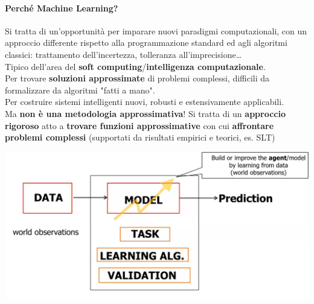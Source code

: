 \documentclass[10pt]{book}
\begin{document}
\paragraph{Perché Machine Learning?} Si tratta di un'opportunità per imparare nuovi paradigmi computazionali, con un approccio differente rispetto alla programmazione standard ed agli algoritmi classici: trattamento dell'incertezza, tolleranza all'imprecisione\ldots\\
Tipico dell'area del \textbf{soft computing}/\textbf{intelligenza computazionale}.\\
Per trovare \textbf{soluzioni approssimate} di problemi complessi, difficili da formalizzare da algoritmi "fatti a mano".\\
Per costruire sistemi intelligenti nuovi, robusti e estensivamente applicabili.\\
Ma \textbf{non è una metodologia approssimativa}! Si tratta di un \textbf{approccio rigoroso} atto a \textbf{trovare funzioni approssimative} con cui \textbf{affrontare problemi complessi} (supportati da risultati empirici e teorici, es. SLT)
\begin{center}
	\includegraphics[scale=0.55]{ml1.png}
\end{center}
\end{document}
